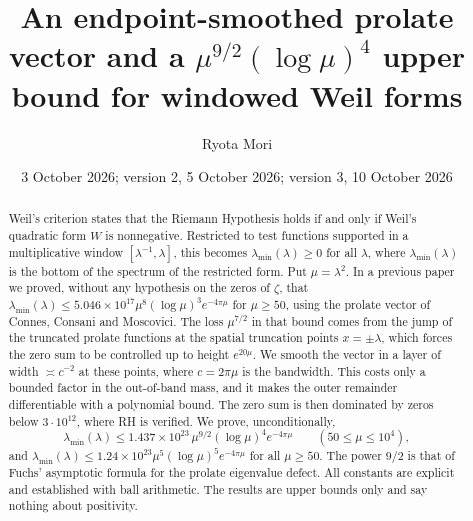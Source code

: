 \documentclass[11pt]{amsart}
\title[Windowed Weil forms: the power $9/2$]{An endpoint-smoothed prolate vector and a $\mu^{9/2}(\log\mu)^4$ upper bound for windowed Weil forms}
\author{Ryota Mori}
\date{3 October 2026; version 2, 5 October 2026; version 3, 10 October 2026}
\theoremstyle{remark}
\numberwithin{equation}{section}
\begin{document}
\begin{abstract}
Weil's criterion states that the Riemann Hypothesis holds if and only if Weil's quadratic form $W$ is nonnegative. Restricted to test functions supported in a multiplicative window $[\lambda^{-1},\lambda]$, this becomes $\lambda_{\min}(\lambda)\ge0$ for all $\lambda$, where $\lambda_{\min}(\lambda)$ is the bottom of the spectrum of the restricted form. Put $\mu=\lambda^2$. In a previous paper we proved, without any hypothesis on the zeros of $\zeta$, that $\lambda_{\min}(\lambda)\le5.046\times10^{17}\mu^8(\log\mu)^3e^{-4\pi\mu}$ for $\mu\ge50$, using the prolate vector of Connes, Consani and Moscovici. The loss $\mu^{7/2}$ in that bound comes from the jump of the truncated prolate functions at the spatial truncation points $x=\pm\lambda$, which forces the zero sum to be controlled up to height $e^{20\mu}$. We smooth the vector in a layer of width $\asymp c^{-2}$ at these points, where $c=2\pi\mu$ is the bandwidth. This costs only a bounded factor in the out-of-band mass, and it makes the outer remainder differentiable with a polynomial bound. The zero sum is then dominated by zeros below $3\cdot10^{12}$, where RH is verified. We prove, unconditionally,
\[
\lambda_{\min}(\lambda)\le1.437\times10^{23}\,\mu^{9/2}(\log\mu)^4e^{-4\pi\mu}\qquad(50\le\mu\le10^4),
\]
and $\lambda_{\min}(\lambda)\le1.24\times10^{23}\mu^5(\log\mu)^5e^{-4\pi\mu}$ for all $\mu\ge50$. The power $9/2$ is that of Fuchs' asymptotic formula for the prolate eigenvalue defect. All constants are explicit and established with ball arithmetic. The results are upper bounds only and say nothing about positivity.
\end{abstract}

\maketitle
\end{document}
